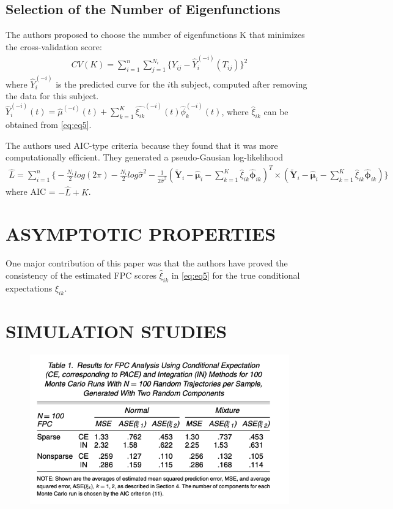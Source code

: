 \documentclass[11pt]{report}
\begin{document}
\subsection*{Selection of the Number of Eigenfunctions}
The authors proposed to choose the number of eigenfunctions K that minimizes the cross-validation score:
\begin{align}
	\label{eq:eq10}
	CV(K) = \sum_{i=1}^{n}\sum_{j=1}^{N_i}\{Y_{ij}-\widehat{Y}_i^{(-i)}(T_{ij})\}^2
\end{align} 
where $\widehat{Y}_i^{(-i)}$ is the predicted curve for the $i$th subject, computed after removing the data for this subject.
$\widehat{Y}_i^{(-i)}(t) = \hat{\mu}^{(-i)}(t) + \sum_{k=1}^{K}\hat{\xi_{ik}}^{(-i)}(t)\hat{\phi}_{k}^{(-i)}(t)$, where $\hat{\xi}_{ik}$ can be obtained from \eqref{eq:eq5}.

The authors used AIC-type criteria because they found that it was more computationally efficient. 
They generated a pseudo-Gausian log-likelihood 
\begin{align}
	\label{eq:eq11}
	\widehat{L} = \sum_{i=1}^n\big\{-\frac{N_i}{2}log(2\pi) - \frac{N_i}{2}log\hat{\sigma}^2 - \frac{1}{2\hat{\sigma}^2}(\widetilde{\pmb{Y}}_i - \hat{\pmb{\mu}}_i - \sum_{k=1}^{K}\hat{\xi}_{ik}\hat{\pmb{\phi}}_{ik})^T \times (\widetilde{\pmb{Y}}_i - \hat{\pmb{\mu}}_i - \sum_{k=1}^{K}\hat{\xi}_{ik}\hat{\pmb{\phi}}_{ik}) \big\}
\end{align} 
where AIC = $-\widehat{L} + K$.

\section{ASYMPTOTIC PROPERTIES}
One major contribution of this paper was that the authors have proved the consistency of the estimated FPC scores $\hat{\xi}_{ik}$ in \eqref{eq:eq5} for the true conditional expectations $\xi_{ik}$. 

\section{SIMULATION STUDIES}
\label{simul}
\begin{figure}[h]
	\includegraphics[width = 7 in]{Figures/Table1.png}
	\centering
\end{figure}
\end{document}
